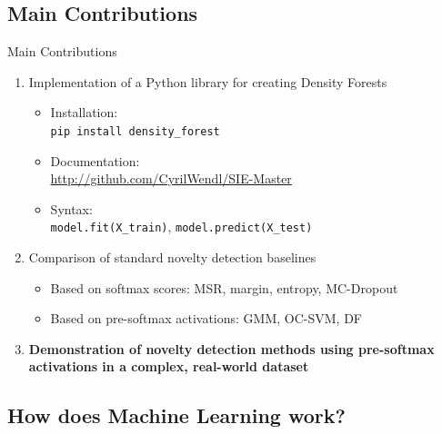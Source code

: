 \documentclass[xcolor={usenames,dvipsnames}]{beamer}
\begin{document}
\subsection{Main Contributions}
\begin{frame}{Main Contributions}
	\begin{enumerate}
		\item Implementation of a Python library for creating Density Forests
		\begin{itemize}
			\item Installation: \\\texttt{pip install density\_forest}\pause 
			\item Documentation:\\ \url{http://github.com/CyrilWendl/SIE-Master} \pause
			\item Syntax:\\ \texttt{model.fit(X\_train)}, \texttt{model.predict(X\_test)} 
		\end{itemize}
		\pause
		\item Comparison of standard novelty detection baselines
		\begin{itemize}
			\item Based on softmax scores: MSR, margin, entropy, MC-Dropout
			\item Based on pre-softmax activations: GMM, OC-SVM, DF
		\end{itemize}
		\pause
		\item \textbf{\color{greenWUR} Demonstration of novelty detection methods using pre-softmax activations in a complex, real-world dataset}
	\end{enumerate}
\end{frame}


\subsection{How does Machine Learning work?}
\end{document}
